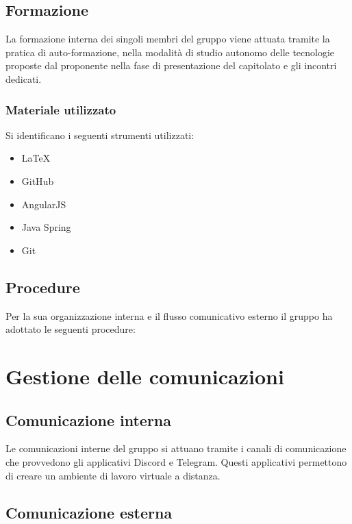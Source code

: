 \subsection{Formazione}

La formazione interna dei singoli membri del gruppo viene attuata tramite la pratica di auto-formazione, nella modalità di studio autonomo delle tecnologie proposte dal proponente nella fase di presentazione del capitolato e gli incontri dedicati.

\subsubsection{Materiale utilizzato}

Si identificano i seguenti strumenti utilizzati:

\begin{itemize}
\item LaTeX
\item GitHub
\item AngularJS
\item Java Spring
\item Git
\end{itemize}

\subsection{Procedure}

Per la sua organizzazione interna e il flusso comunicativo esterno il gruppo ha adottato le seguenti procedure:

\section{Gestione delle comunicazioni}

\subsection{Comunicazione interna}

Le comunicazioni interne del gruppo si attuano tramite i canali di comunicazione che provvedono gli applicativi Discord e Telegram. Questi applicativi permettono di creare un ambiente di lavoro virtuale a distanza.

\subsection{Comunicazione esterna}


